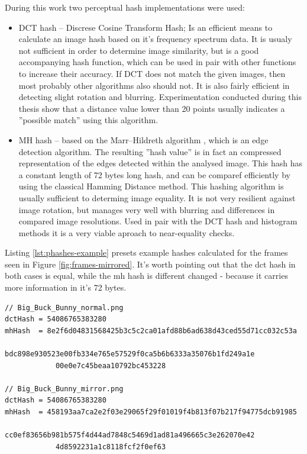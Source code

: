 During this work two perceptual hash implementations were used:
\begin{itemize}
  \item DCT hash -- Discrese Cosine Transform Hash; Is an efficient means to calculate an image hash based on it's
                    frequency spectrum data. It is usualy not sufficient in order to determine image similarity, 
                    but is a good accompanying hash function, which can be used in pair with other functions to increase 
                    their accuracy. If DCT does not match the given images, then most probably other algorithms also 
                    should not. It is also fairly efficient in detecting slight rotation and blurring. Experimentation 
                    conducted during this thesis show that a distance value lower than 20 points usually indicates a 
                    ''possible match'' using this algorithm.
                    
  \item MH hash -- based on the Marr--Hildreth algorithm \cite{marr-hildreth}, which is an edge detection algorithm.
                   The resulting ''hash value'' is in fact an compressed representation of the edges detected within the 
                   analysed image. This hash has a constant length of 72 bytes long hash, and can be comparef efficiently 
                   by using the classical Hamming Distance \cite{hamming-distance} method. This hashing algorithm is
                   usually sufficient to determing image equality. It is not very resilient against image rotation, but 
                   manages very well with blurring and differences in compared image resolutions. Used in pair with the 
                   DCT hash and histogram methods it is a very viable aproach to near-equality checks.
\end{itemize}

Listing \ref{lst:phashes-example} presets example hashes calculated for the frames seen in Figure \ref{fig:frames-mirrored}. It's worth pointing out that the dct hash in both cases is equal, while the mh hash is different changed - because it carries more information in it's 72 bytes.

\begin{lstlisting}[caption={Example hashes, calculated for a original and mirrored frame}, label={lst:phashes-example}]
// Big_Buck_Bunny_normal.png
dctHash = 54086765383280
mhHash  = 8e2f6d04831568425b3c5c2ca01afd88b6ad638d43ced55d71cc032c53a
            bdc898e930523e00fb334e765e57529f0ca5b6b6333a35076b1fd249a1e
            00e0e7c45beaa10792bc453228
                        
// Big_Buck_Bunny_mirror.png
dctHash = 54086765383280
mhHash  = 458193aa7ca2e2f03e29065f29f01019f4b813f07b217f94775dcb91985
            cc0ef83656b981b575f4d44ad7848c5469d1ad81a496665c3e262070e42
            4d8592231a1c8118fcf2f0ef63
\end{lstlisting}

